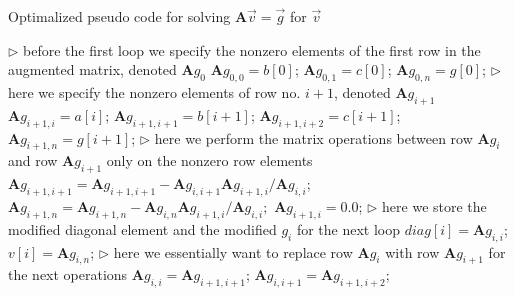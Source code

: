 \documentclass[english,notitlepage]{revtex4-1}  %
\begin{document}
\begin{algorithm}[H]
    \caption{Optimalized pseudo code for solving $\textbf{A}\vec{v} = \vec{g}$ for $\vec{v}$}\label{algorithm fixed}
    \begin{algorithmic}
        \State $\triangleright$ before the first loop we specify the nonzero elements of the first row in the augmented matrix, denoted $\textbf{A}g_0$
        \State $\textbf{A}g_{0,0} = b[0]$; 
        \State $\textbf{A}g_{0,1} = c[0]$; 
        \State $\textbf{A}g_{0,n} = g[0]$; 
        \State
         
        \State $\triangleright$ here we specify the nonzero elements of row no. $i+1$, denoted $\textbf{A}g_{i+1}$
        \State $\textbf{A}g_{i+1,i} = a[i]$; 
        \State $\textbf{A}g_{i+1,i+1} = b[i+1]$; 
         
        \State $\textbf{A}g_{i+1,i+2} = c[i+1]$; 
        \EndIf
        \State $\textbf{A}g_{i+1,n} = g[i+1]$; 
        \State
        \State $\triangleright$ here we perform the matrix operations between row $\textbf{A}g_{i}$ and row $\textbf{A}g_{i+1}$ only on the nonzero row elements
        \State $\textbf{A}g_{i+1,i+1} = \textbf{A}g_{i+1,i+1} - \textbf{A}g_{i,i+1} \textbf{A}g_{i+1,i} / \textbf{A}g_{i,i}$; 
        \State $\textbf{A}g_{i+1,n} = \textbf{A}g_{i+1,n} - \textbf{A}g_{i,n} \textbf{A}g_{i+1,i} / \textbf{A}g_{i,i};$ 
        \State $\textbf{A}g_{i+1,i} = 0.0$; 
        \State
        \State $\triangleright$ here we store the modified diagonal element and the modified $g_i$ for the next loop
        \State $diag[i] = \textbf{A}g_{i,i}$; 
        \State $v[i] = \textbf{A}g_{i,n}$; 
        \State
        \State $\triangleright$ here we essentially want to replace row $\textbf{A}g_{i}$ with row $\textbf{A}g_{i+1}$ for the next operations
        \State $\textbf{A}g_{i,i} = \textbf{A}g_{i+1,i+1}$; 
        \State $\textbf{A}g_{i,i+1} = \textbf{A}g_{i+1,i+2}$; 

\end{algorithmic}
\end{algorithm}
\end{document}
